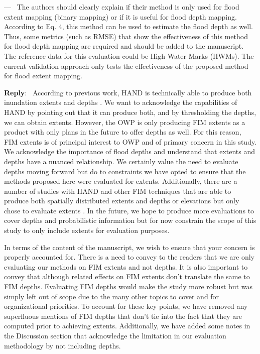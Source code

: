 \documentclass[11pt]{article}
\newcounter{reviewer}
\newcounter{point}[reviewer]
\renewcommand{\thepoint}{P\,\thereviewer.\arabic{point}}
\newenvironment{point}
   {\refstepcounter{point} \bigskip \noindent {\textbf{Reviewer~Point~\thepoint} } ---\ }
   {\par }
\newenvironment{reply}
   {\medskip \noindent \begin{sf}\textbf{Reply}:\  }
   {\medskip \end{sf}}
\begin{document}
\begin{point}
The authors should clearly explain if their method is only used for flood extent mapping (binary mapping) or if it is useful for flood depth mapping.
According to Eq. 4, this method can be used to estimate the flood depth as well.
Thus, some metrics (such as RMSE) that show the effectiveness of this method for flood depth mapping are required and should be added to the manuscript.
The reference data for this evaluation could be High Water Marks (HWMs).
The current validation approach only tests the effectiveness of the proposed method for flood extent mapping. 
\end{point}

\begin{reply}
According to previous work, HAND is technically able to produce both inundation extents and depths \cite{nobre2016hand,maidment2017conceptual,garousi2019terrain,li2020evaluation,li2022accounting,li2023comparative}. 
We want to acknowledge the capabilities of HAND by pointing out that it can produce both, and by thresholding the depths, we can obtain extents.
However, the OWP is only producing FIM extents as a product with only plans in the future to offer depths as well.
For this reason, FIM extents is of principal interest to OWP and of primary concern in this study.
We acknowledge the importance of flood depths and understand that extents and depths have a nuanced relationship.
We certainly value the need to evaluate depths moving forward but do to constraints we have opted to ensure that the methods proposed here were evaluated for extents.
Additionally, there are a number of studies with HAND and other FIM techniques that are able to produce both spatially distributed extents and depths or elevations but only chose to evaluate extents \cite{garousi2019terrain,li2023comparative,li2022accounting,papaioannou2016flood,mcgehee2016modified,zhang2018comparative,shastry2019using,follum2017autorapid,wing2017validation,aristizabal2021mapping,rahimzadeh2019evaluating,amarnath2015modelling,wood2016calibration,hooker2022spatial,tansar2020flood}.
In the future, we hope to produce more evaluations to cover depths and probabilistic information but for now constrain the scope of this study to only include extents for evaluation purposes.

In terms of the content of the manuscript, we wish to ensure that your concern is properly accounted for.
There is a need to convey to the readers that we are only evaluating our methods on FIM extents and not depths.
It is also important to convey that although related effects on FIM extents don't translate the same to FIM depths.
Evaluating FIM depths would make the study more robust but was simply left out of scope due to the many other topics to cover and for organizational priorities.
To account for these key points, we have removed any superfluous mentions of FIM depths that don't tie into the fact that they are computed prior to achieving extents.
Additionally, we have added some notes in the Discussion section that acknowledge the limitation in our evaluation methodology by not including depths.
\end{reply}
\end{document}

